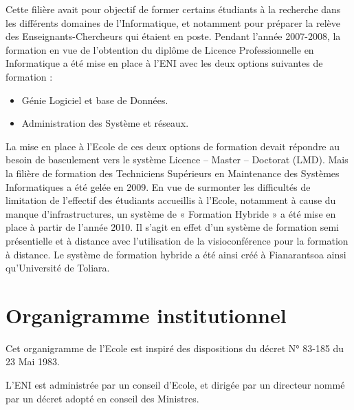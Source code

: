 \documentclass[12pt]{report}
\begin{document}
				 \begin{center}
					 \begin{minipage}{\textwidth}
	
						\hspace{15pt} Cette filière avait pour objectif de former certains étudiants à la recherche dans les différents domaines de l’Informatique, et notamment pour préparer la relève des Enseignants-Chercheurs qui étaient en poste. Pendant l’année 2007-2008, la formation en vue de l’obtention du diplôme de Licence Professionnelle en Informatique a été mise en place à l’ENI avec les deux options suivantes de formation :
						
						\begin{itemize}
							\item Génie Logiciel et base de Données.
							\item Administration des Système et réseaux.\\
						\end{itemize}
					\end{minipage}

				\end{center}
				
				La mise en place à l’Ecole de ces deux options de formation devait répondre au besoin de basculement vers le système Licence – Master – Doctorat (LMD). Mais la filière de formation des Techniciens Supérieurs en Maintenance des Systèmes Informatiques a été gelée en 2009. 
En vue de surmonter les difficultés de limitation de l’effectif des étudiants accueillis à l’Ecole, notamment à cause du manque d’infrastructures, un système de « Formation Hybride » a été mise en place à partir de l’année 2010. Il s’agit en effet d’un système de formation semi présentielle et à distance avec l’utilisation de la visioconférence pour la formation à distance. Le système de formation hybride a été ainsi créé à Fianarantsoa ainsi qu’Université de Toliara.

				\section{Organigramme institutionnel}

				\hspace{15pt} Cet organigramme de l’Ecole est inspiré des dispositions du décret N° 83-185 du 23 Mai 1983.

				L’ENI est administrée par un conseil d’Ecole, et dirigée par un directeur nommé par un décret adopté en conseil des Ministres.
\end{document}
